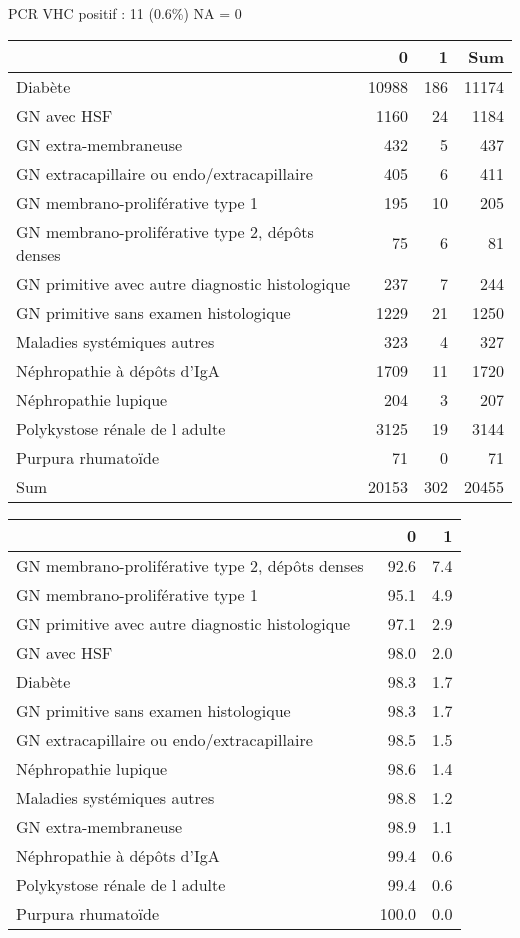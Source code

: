 \documentclass[11pt,a4paper]{article}\usepackage[]{graphicx}\usepackage[]{color}
\begin{document}
PCR VHC positif : 11 (0.6\%) NA = 0
\begin{table}[H]
\centering
\begin{tabular}{lrrr}
  \hline
 & 0 & 1 & Sum \\ 
  \hline
Diabète & 10988 & 186 & 11174 \\ 
  GN avec HSF & 1160 & 24 & 1184 \\ 
  GN extra-membraneuse & 432 & 5 & 437 \\ 
  GN extracapillaire ou endo/extracapillaire & 405 & 6 & 411 \\ 
  GN membrano-proliférative type 1 & 195 & 10 & 205 \\ 
  GN membrano-proliférative type 2, dépôts denses & 75 & 6 & 81 \\ 
  GN primitive avec autre diagnostic histologique & 237 & 7 & 244 \\ 
  GN primitive sans examen histologique & 1229 & 21 & 1250 \\ 
  Maladies systémiques autres & 323 & 4 & 327 \\ 
  Néphropathie à dépôts d'IgA & 1709 & 11 & 1720 \\ 
  Néphropathie lupique & 204 & 3 & 207 \\ 
  Polykystose rénale de l adulte & 3125 & 19 & 3144 \\ 
  Purpura rhumatoïde & 71 & 0 & 71 \\ 
  Sum & 20153 & 302 & 20455 \\ 
   \hline
\end{tabular}
\end{table}
\begin{table}[H]
\centering
\begin{tabular}{lrr}
  \hline
 & 0 & 1 \\ 
  \hline
GN membrano-proliférative type 2, dépôts denses & 92.6 & 7.4 \\ 
  GN membrano-proliférative type 1 & 95.1 & 4.9 \\ 
  GN primitive avec autre diagnostic histologique & 97.1 & 2.9 \\ 
  GN avec HSF & 98.0 & 2.0 \\ 
  Diabète & 98.3 & 1.7 \\ 
  GN primitive sans examen histologique & 98.3 & 1.7 \\ 
  GN extracapillaire ou endo/extracapillaire & 98.5 & 1.5 \\ 
  Néphropathie lupique & 98.6 & 1.4 \\ 
  Maladies systémiques autres & 98.8 & 1.2 \\ 
  GN extra-membraneuse & 98.9 & 1.1 \\ 
  Néphropathie à dépôts d'IgA & 99.4 & 0.6 \\ 
  Polykystose rénale de l adulte & 99.4 & 0.6 \\ 
  Purpura rhumatoïde & 100.0 & 0.0 \\ 
   \hline
\end{tabular}
\end{table}
\end{document}
